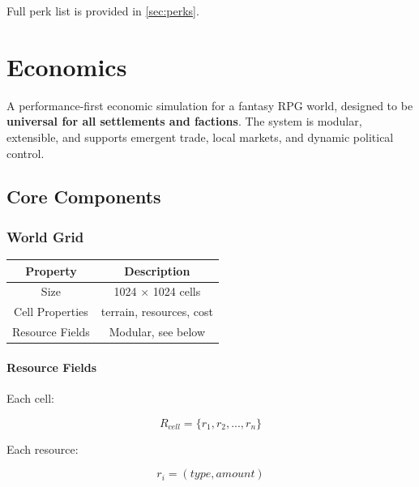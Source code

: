 \documentclass[a4paper,12pt]{article}
\begin{document}
Full perk list is provided in \autoref{sec:perks}.

\newpage

\section{Economics}
\label{sec:economics}

A performance-first economic simulation for a fantasy RPG world, designed to be \textbf{universal for all settlements and factions}. The system is modular, extensible, and supports emergent trade, local markets, and dynamic political control.



\subsection{Core Components}

\subsubsection{World Grid}

\begin{table}[H]
\centering
\begin{tabular}{|c|c|}
\hline
Property & Description \\
\hline
Size & 1024 $\times$ 1024 cells \\
Cell Properties & terrain, resources, cost \\
Resource Fields & Modular, see below \\
\hline
\end{tabular}
\end{table}



\paragraph{Resource Fields}

Each cell:

\begin{equation}
R_{cell} = \{ r_1, r_2, ..., r_n \}
\end{equation}

Each resource:

\begin{equation}
r_i = (type, amount)
\end{equation}
\end{document}
